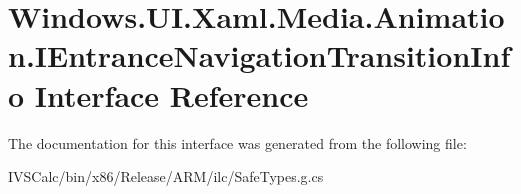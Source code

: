 \hypertarget{interface_windows_1_1_u_i_1_1_xaml_1_1_media_1_1_animation_1_1_i_entrance_navigation_transition_info}{}\section{Windows.\+U\+I.\+Xaml.\+Media.\+Animation.\+I\+Entrance\+Navigation\+Transition\+Info Interface Reference}
\label{interface_windows_1_1_u_i_1_1_xaml_1_1_media_1_1_animation_1_1_i_entrance_navigation_transition_info}


The documentation for this interface was generated from the following file\+:\begin{DoxyCompactItemize}
\item 
I\+V\+S\+Calc/bin/x86/\+Release/\+A\+R\+M/ilc/Safe\+Types.\+g.\+cs\end{DoxyCompactItemize}
